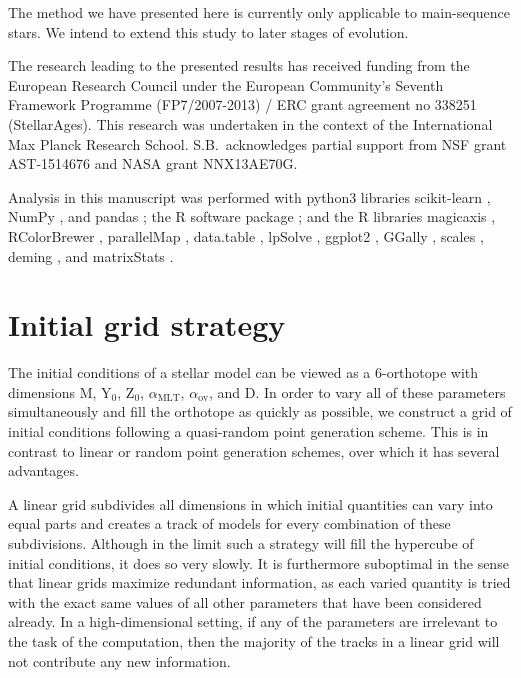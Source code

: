 \documentclass[twocolumn,twocolappendix]{aastex6}
\begin{document}
The method we have presented here is currently only applicable to main-sequence stars. We intend to extend this study to later stages of evolution. 


\acknowledgments The research leading to the presented results has received funding from the European Research Council under the European Community's Seventh Framework Programme (FP7/2007-2013) / ERC grant agreement no 338251 (StellarAges). This research was undertaken in the context of the International Max Planck Research School. S.B.\ acknowledges partial support from NSF grant AST-1514676 and NASA grant NNX13AE70G.

Analysis in this manuscript was performed with python3 libraries scikit-learn \citep{scikit-learn}, NumPy \citep{van2011numpy}, and pandas \citep{mckinney2010data}; the R software package \citep{R}; and the R libraries magicaxis \citep{magicaxis}, RColorBrewer \citep{RColorBrewer}, parallelMap \citep{parallelMap}, data.table \citep{data.table}, lpSolve \citep{lpSolve}, ggplot2 \citep{ggplot2}, GGally \citep{GGally}, scales \citep{scales}, deming \citep{deming}, and matrixStats \citep{matrixStats}. 

\appendix


\section{Initial grid strategy}
\label{sec:grid}
The initial conditions of a stellar model can be viewed as a 6-orthotope with dimensions M, Y$_0$, Z$_0$, $\alpha_{\text{MLT}}$, $\alpha_{\text{ov}}$, and D. In order to vary all of these parameters simultaneously and fill the orthotope as quickly as possible, we construct a grid of initial conditions following a quasi-random point generation scheme. This is in contrast to linear or random point generation schemes, over which it has several advantages. 

A linear grid subdivides all dimensions in which initial quantities can vary into equal parts and creates a track of models for every combination of these subdivisions. Although in the limit such a strategy will fill the hypercube of initial conditions, it does so very slowly. It is furthermore suboptimal in the sense that linear grids maximize redundant information, as each varied quantity is tried with the exact same values of all other parameters that have been considered already. In a high-dimensional setting, if any of the parameters are irrelevant to the task of the computation, then the majority of the tracks in a linear grid will not contribute any new information.
\end{document}
